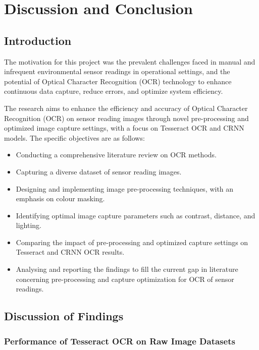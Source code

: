 \chapter{Discussion and Conclusion}
\label{chap:conclusion}

\section{Introduction}

The motivation for this project was the prevalent challenges faced in manual and infrequent environmental sensor readings in operational settings, and the potential of Optical Character Recognition (OCR) technology to enhance continuous data capture, reduce errors, and optimize system efficiency.


The research aims to enhance the efficiency and accuracy of Optical Character Recognition (OCR) on sensor reading images through novel pre-processing and optimized image capture settings, with a focus on Tesseract OCR and CRNN models. The specific objectives are as follows:

\begin{itemize}
    \item Conducting a comprehensive literature review on OCR methods.
    \item Capturing a diverse dataset of sensor reading images.
    \item Designing and implementing image pre-processing techniques, with an emphasis on colour masking.
    \item Identifying optimal image capture parameters such as contrast, distance, and lighting.
    \item Comparing the impact of pre-processing and optimized capture settings on Tesseract and CRNN OCR results.
    \item Analysing and reporting the findings to fill the current gap in literature concerning pre-processing and capture optimization for OCR of sensor readings.
\end{itemize}

\section{Discussion of Findings}


\subsection{Performance of Tesseract OCR on Raw Image Datasets}

